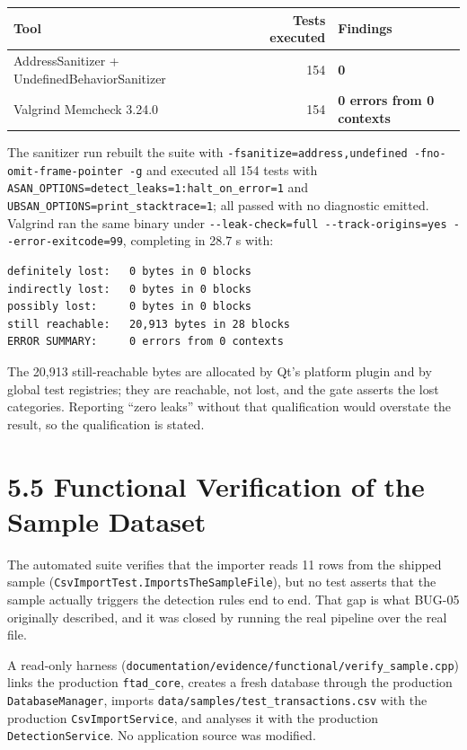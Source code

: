 \documentclass[
  12pt,
]{report}
\begin{document}
\begin{longtable}[]{@{}lrl@{}}
\toprule\noalign{}
Tool & Tests executed & Findings \\
\midrule\noalign{}
\endhead
\bottomrule\noalign{}
\endlastfoot
Address\-Sanitizer + Undefined\-Behavior\-Sanitizer & 154 & \textbf{0} \\
Valgrind Memcheck 3.24.0 & 154 & \textbf{0 errors from 0 contexts} \\
\end{longtable}

The sanitizer run rebuilt the suite with
\texttt{-fsanitize=address,undefined\ -fno-omit-frame-pointer\ -g} and
executed all 154 tests with
\texttt{ASAN\_OPTIONS=detect\_leaks=1:halt\_on\_error=1} and
\texttt{UBSAN\_OPTIONS=print\_stacktrace=1}; all passed with no
diagnostic emitted. Valgrind ran the same binary under
\texttt{-\/\allowbreak{}-leak-check=full\ -\/\allowbreak{}-track-origins=yes\ -\/\allowbreak{}-error-exitcode=99},
completing in 28.7 s with:

\begin{verbatim}
definitely lost:   0 bytes in 0 blocks
indirectly lost:   0 bytes in 0 blocks
possibly lost:     0 bytes in 0 blocks
still reachable:   20,913 bytes in 28 blocks
ERROR SUMMARY:     0 errors from 0 contexts
\end{verbatim}

The 20,913 still-reachable bytes are allocated by Qt's platform plugin
and by global test registries; they are reachable, not lost, and the
gate asserts the lost categories. Reporting ``zero leaks'' without that
qualification would overstate the result, so the qualification is
stated.

\section{5.5 Functional Verification of the Sample
Dataset}\label{functional-verification-of-the-sample-dataset}

The automated suite verifies that the importer reads 11 rows from the
shipped sample (\texttt{CsvImportTest.Imports\-The\-Sample\-File}), but no
test asserts that the sample actually triggers the detection rules end
to end. That gap is what BUG-05 originally described, and it was closed
by running the real pipeline over the real file.

A read-only harness
(\texttt{documentation/\allowbreak{}evidence/\allowbreak{}functional/\allowbreak{}verify\_sample.cpp}) links
the production \texttt{ftad\_core}, creates a fresh database through the
production \texttt{DatabaseManager}, imports
\texttt{data/\allowbreak{}samples/\allowbreak{}test\_transactions.csv} with the production
\texttt{Csv\-Import\-Service}, and analyses it with the production
\texttt{Detection\-Service}. No application source was modified.
\end{document}
